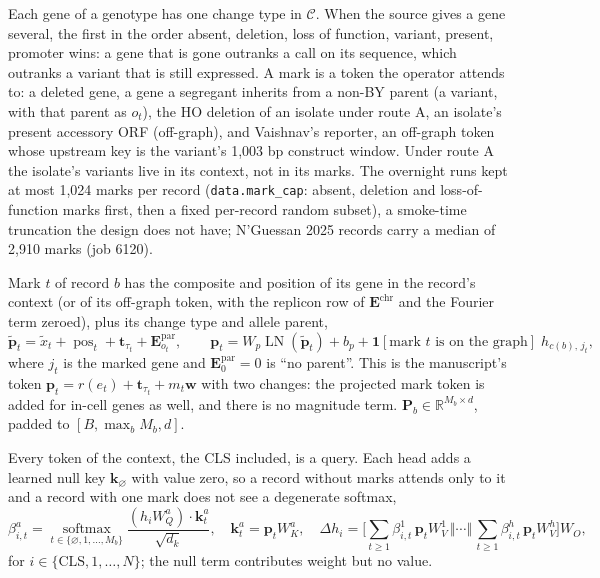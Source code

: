 Each gene of a genotype has one change type in $\mathcal{C}$. When the source gives a gene
several, the first in the order absent, deletion, loss of function, variant, present,
promoter wins: a gene that is gone outranks a call on its sequence, which outranks a
variant that is still expressed. A mark is a token the operator attends to: a deleted gene,
a gene a segregant inherits from a non-BY parent (a variant, with that parent as $o_t$), the
HO deletion of an isolate under route A, an isolate's present accessory ORF (off-graph), and
Vaishnav's reporter, an off-graph token whose upstream key is the variant's 1{,}003 bp
construct window. Under route A the isolate's variants live in its context, not in its
marks. The overnight runs kept at most 1{,}024 marks per record (\texttt{data.mark\_cap}:
absent, deletion and loss-of-function marks first, then a fixed per-record random subset),
a smoke-time truncation the design does not have; N'Guessan 2025 records carry a median of
2{,}910 marks (job 6120).

Mark $t$ of record $b$ has the composite and position of its gene in the record's context
(or of its off-graph token, with the replicon row of $\mathbf{E}^{\mathrm{chr}}$ and the
Fourier term zeroed), plus its change type and allele parent,
\begin{equation}
\tilde{\mathbf{p}}_t = \tilde x_{t} + \operatorname{pos}_{t} + \mathbf{t}_{\tau_t} + \mathbf{E}^{\mathrm{par}}_{o_t},
\qquad
\mathbf{p}_t = W_p \operatorname{LN}(\tilde{\mathbf{p}}_t) + b_p + \mathbf{1}[\text{mark } t \text{ is on the graph}]\; h_{c(b),\,j_t},
\label{eq:markkey}
\end{equation}
where $j_t$ is the marked gene and $\mathbf{E}^{\mathrm{par}}_0 = 0$ is ``no parent''. This is
the manuscript's token $\mathbf{p}_t = r(e_t) + \mathbf{t}_{\tau_t} + m_t \mathbf{w}$ with two
changes: the projected mark token is added for in-cell genes as well, and there is no
magnitude term. $\mathbf{P}_b \in \mathbb{R}^{M_b \times d}$, padded to $[B, \max_b M_b, d]$.

Every token of the context, the CLS included, is a query. Each head adds a learned null key
$\mathbf{k}_{\varnothing}$ with value zero, so a record without marks attends only to it and a
record with one mark does not see a degenerate softmax,
\begin{equation}
\beta^{a}_{i,t} = \operatorname*{softmax}_{t \in \{\varnothing, 1, \ldots, M_b\}} \frac{(h_i W^{a}_Q) \cdot \mathbf{k}^{a}_t}{\sqrt{d_k}},
\quad
\mathbf{k}^{a}_t = \mathbf{p}_t W^{a}_K,
\quad
\Delta h_i = \Big[\textstyle\sum_{t \ge 1} \beta^{1}_{i,t}\, \mathbf{p}_t W^{1}_V \,\Big\Vert \cdots \Big\Vert\, \sum_{t \ge 1} \beta^{h}_{i,t}\, \mathbf{p}_t W^{h}_V\Big] W_O,
\label{eq:opattn}
\end{equation}
for $i \in \{\mathrm{CLS}, 1, \ldots, N\}$; the null term contributes weight but no value.

